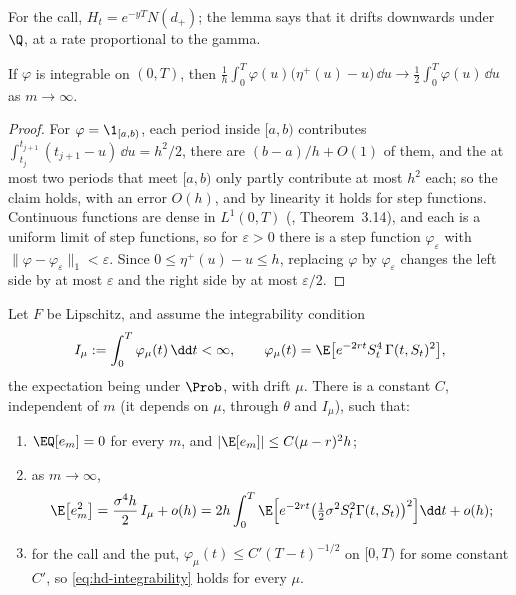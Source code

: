 For the call, $H_t=e^{-yT}N(d_+)$; the lemma says that it drifts downwards under $\Q$, at a
rate proportional to the gamma.

\begin{lemma}\label{lem:hd-sawtooth}
If $\varphi$ is integrable on $(0,T)$, then
$\frac1h\int_0^T\varphi(u)\big(\eta^+(u)-u\big)\,\dd u\to\frac12\int_0^T\varphi(u)\,\dd u$ as $m\to\infty$.
\end{lemma}

\begin{proof}
For $\varphi=\1_{[a,b)}$, each period inside $[a,b)$ contributes
$\int_{t_j}^{t_{j+1}}(t_{j+1}-u)\,\dd u=h^2/2$, there are $(b-a)/h+O(1)$ of them, and the at most
two periods that meet $[a,b)$ only partly contribute at most $h^2$ each; so the claim holds,
with an error $O(h)$, and by linearity it holds for step functions. Continuous functions are
dense in $L^1(0,T)$ (\textcite{rudin-rca}, Theorem~3.14), and each is a uniform limit of step
functions, so for $\varepsilon>0$ there is a step function $\varphi_\varepsilon$ with
$\|\varphi-\varphi_\varepsilon\|_1<\varepsilon$. Since $0\le\eta^+(u)-u\le h$, replacing $\varphi$ by
$\varphi_\varepsilon$ changes the left side by at most $\varepsilon$ and the right side by at most
$\varepsilon/2$.
\end{proof}

\begin{proposition}\label{prop:hd-discrete-error}
Let $F$ be Lipschitz, and assume the integrability condition
\begin{equation}\label{eq:hd-integrability}
  I_\mu:=\int_0^T\varphi_\mu(t)\,\dd t<\infty,\qquad
  \varphi_\mu(t)=\E\big[e^{-2rt}S_t^4\,\Gamma(t,S_t)^2\big],
\end{equation}
the expectation being under $\Prob$, with drift $\mu$. There is a constant $C$, independent of
$m$ (it depends on $\mu$, through $\theta$ and $I_\mu$), such that:
\begin{enumerate}[label=(\roman*)]
  \item $\EQ[e_m]=0$ for every $m$, and $|\E[e_m]|\le C(\mu-r)^2h$;
  \item as $m\to\infty$,
    \begin{equation}\label{eq:hd-variance}
      \E\big[e_m^2\big]=\frac{\sigma^4h}{2}\,I_\mu+o(h)
      =2h\int_0^T\E\Big[e^{-2rt}\big(\tfrac12\sigma^2S_t^2\Gamma(t,S_t)\big)^2\Big]\dd t+o(h);
    \end{equation}
  \item for the call and the put, $\varphi_\mu(t)\le C'(T-t)^{-1/2}$ on $[0,T)$ for some
    constant $C'$, so \eqref{eq:hd-integrability} holds for every $\mu$.
\end{enumerate}
\end{proposition}

